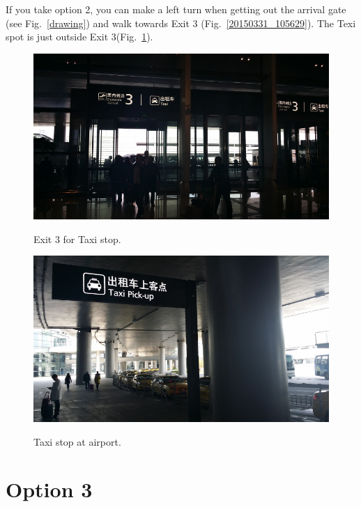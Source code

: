 \documentclass[11pt]{article}
\begin{document}
If you take option 2, you can make a left turn when getting out the arrival gate (see Fig.~\ref{drawing}) and walk towards Exit 3 (Fig.~\ref{20150331_105629}).
The Texi spot is just outside Exit 3(Fig.~\ref{20150331_105836}).
\begin{figure}[!h]
	\begin{minipage}[t]{.5\textwidth}
     	\centering
   	 	\includegraphics[scale=0.27]{20150331_105629.jpg}
    		\caption{Exit 3 for Taxi stop.\label{20150331_105629}}
	\end{minipage}%
     \begin{minipage}[t]{.5\textwidth}
         \centering
       	 \includegraphics[scale=0.27]{20150331_105836.jpg} \\
	 	\caption{Taxi stop at airport.\label{20150331_105836}}
    \end{minipage}%
 \end{figure}

\section{Option 3}
\end{document}
